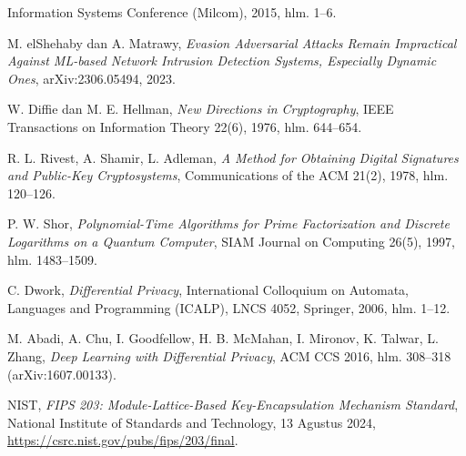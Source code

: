\begin{sloppypar}
\begin{enumerate}[label={[\arabic*]},leftmargin=1.8em]
        Information Systems Conference (Milcom), 2015, hlm. 1--6.
  \item M. elShehaby dan A. Matrawy, \emph{Evasion Adversarial Attacks Remain
        Impractical Against ML-based Network Intrusion Detection Systems,
        Especially Dynamic Ones}, arXiv:2306.05494, 2023.
  \item W. Diffie dan M. E. Hellman, \emph{New Directions in Cryptography},
        IEEE Transactions on Information Theory 22(6), 1976, hlm. 644--654.
  \item R. L. Rivest, A. Shamir, L. Adleman, \emph{A Method for Obtaining Digital
        Signatures and Public-Key Cryptosystems}, Communications of the ACM 21(2),
        1978, hlm. 120--126.
  \item P. W. Shor, \emph{Polynomial-Time Algorithms for Prime Factorization and
        Discrete Logarithms on a Quantum Computer}, SIAM Journal on Computing
        26(5), 1997, hlm. 1483--1509.
  \item C. Dwork, \emph{Differential Privacy}, International Colloquium on
        Automata, Languages and Programming (ICALP), LNCS 4052, Springer, 2006,
        hlm. 1--12.
  \item M. Abadi, A. Chu, I. Goodfellow, H. B. McMahan, I. Mironov, K. Talwar,
        L. Zhang, \emph{Deep Learning with Differential Privacy}, ACM CCS 2016,
        hlm. 308--318 (arXiv:1607.00133).
  \item NIST, \emph{FIPS 203: Module-Lattice-Based Key-Encapsulation Mechanism
        Standard}, National Institute of Standards and Technology, 13 Agustus
        2024, \url{https://csrc.nist.gov/pubs/fips/203/final}.
\end{enumerate}
\end{sloppypar}
